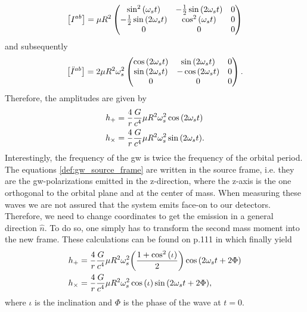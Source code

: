 \begin{equation}\label{def:binary_system_second_mass_moment}
\left[ I^{ab}\right] = \mu R^2\begin{pmatrix}
		\sin^2{\left( \omega_s t \right)} & -\frac{1}{2}\sin{\left( 2\omega_s t \right)} & 0\\
		-\frac{1}{2}\sin{\left( 2\omega_s t \right)} & \cos^2{\left( \omega_s t \right)} & 0\\
		0 & 0 & 0
	\end{pmatrix}
\end{equation}
and subsequently
\begin{equation}\label{def:binary_system_second_mass_moment_time_derivative}
\left[ \ddot{I}^{ab}\right] = 2 \mu R^2\omega_s^2
	\begin{pmatrix}
		\cos{\left( 2\omega_s t \right)} & \sin{\left( 2\omega_s t \right)} & 0\\
		\sin{\left( 2\omega_s t \right)} & -\cos{\left( 2\omega_s t \right)} & 0\\
		0 & 0 & 0
	\end{pmatrix}.
\end{equation}
Therefore, the amplitudes are given by
\begin{align}\label{def:gw_source_frame}
h_+ &= \frac{4}{r}\frac{G}{c^4}\mu R^2 \omega_s^2\cos{\left( 2\omega_s t \right)}\nonumber\\
h_\times &= \frac{4}{r}\frac{G}{c^4}\mu R^2 \omega_s^2\sin{\left( 2\omega_s t \right)}.
\end{align}
Interestingly, the frequency of the \gls{gw} is twice the frequency of the orbital period.\\
The equations \eqref{def:gw_source_frame} are written in the source frame, i.e. they are the \gls{gw}-polarizations emitted in the z-direction, where the z-axis is the one orthogonal to the orbital plane and at the center of mass. When measuring these waves we are not assured that the system emits face-on to our detectors. Therefore, we need to change coordinates to get the emission in a general direction $\hat{n}$. To do so, one simply has to transform the second mass moment into the new frame. These calculations can be found on p.111 in \cite{gwv1} which finally yield
\begin{align}\label{def:gw_travel_direction}
h_+ &= \frac{4}{r}\frac{G}{c^4}\mu R^2 \omega_s^2{\left( \frac{1+\cos^2{\left( \iota \right)}}{2} \right)}\cos{\left( 2\omega_s t+2\Phi \right)}\nonumber\\
h_\times &= \frac{4}{r}\frac{G}{c^4}\mu R^2 \omega_s^2\cos{\left( \iota \right)}\sin{\left( 2\omega_s t+2\Phi \right)},
\end{align}
where $\iota$ is the inclination and $\Phi$ is the phase of the wave at $t=0$.\medskip\\
